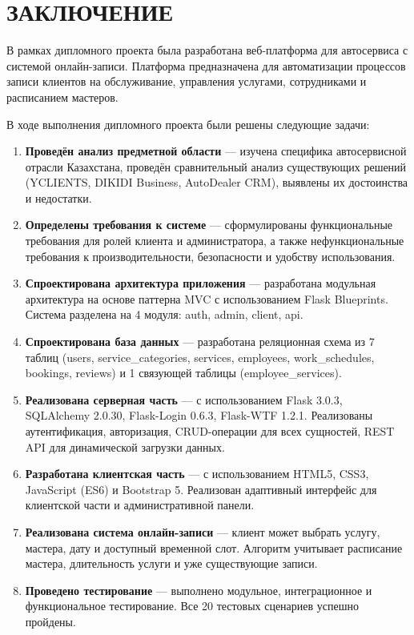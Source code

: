 \documentclass[14pt,a4paper,oneside]{extarticle}
\begin{document}
\newpage
\section*{ЗАКЛЮЧЕНИЕ}

В рамках дипломного проекта была разработана веб-платформа для автосервиса с системой онлайн-записи. Платформа предназначена для автоматизации процессов записи клиентов на обслуживание, управления услугами, сотрудниками и расписанием мастеров.

В ходе выполнения дипломного проекта были решены следующие задачи:

\begin{enumerate}[leftmargin=2cm]
    \item \textbf{Проведён анализ предметной области} --- изучена специфика автосервисной отрасли Казахстана, проведён сравнительный анализ существующих решений (YCLIENTS, DIKIDI Business, AutoDealer CRM), выявлены их достоинства и недостатки.

    \item \textbf{Определены требования к системе} --- сформулированы функциональные требования для ролей клиента и администратора, а также нефункциональные требования к производительности, безопасности и удобству использования.

    \item \textbf{Спроектирована архитектура приложения} --- разработана модульная архитектура на основе паттерна MVC с использованием Flask Blueprints. Система разделена на 4 модуля: auth, admin, client, api.

    \item \textbf{Спроектирована база данных} --- разработана реляционная схема из 7 таблиц (users, service\_categories, services, employees, work\_schedules, bookings, reviews) и 1 связующей таблицы (employee\_services).

    \item \textbf{Реализована серверная часть} --- с использованием Flask 3.0.3, SQLAlchemy 2.0.30, Flask-Login 0.6.3, Flask-WTF 1.2.1. Реализованы аутентификация, авторизация, CRUD-операции для всех сущностей, REST API для динамической загрузки данных.

    \item \textbf{Разработана клиентская часть} --- с использованием HTML5, CSS3, JavaScript (ES6) и Bootstrap 5. Реализован адаптивный интерфейс для клиентской части и административной панели.

    \item \textbf{Реализована система онлайн-записи} --- клиент может выбрать услугу, мастера, дату и доступный временной слот. Алгоритм учитывает расписание мастера, длительность услуги и уже существующие записи.

    \item \textbf{Проведено тестирование} --- выполнено модульное, интеграционное и функциональное тестирование. Все 20 тестовых сценариев успешно пройдены.
\end{enumerate}
\end{document}
